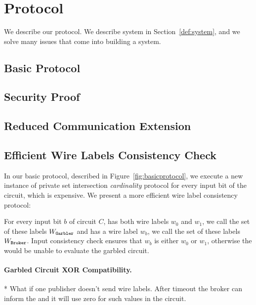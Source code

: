 \section{Protocol}
\label{sec:protocol}

We describe our protocol. We describe system in Section~\ref{def:system}, and
we solve many issues that come into building a system.


\subsection{Basic Protocol}


\subsection{Security Proof}


\subsection{Reduced Communication Extension}


\subsection{Efficient Wire Labels Consistency Check} In our basic
protocol, described in Figure~\ref{fig:basicprotocol}, we execute a new
instance of private set intersection \emph{cardinality} protocol for every
input bit of the circuit, which is expensive.  We present a more efficient wire
label consistency protocol:

For every input bit $b$ of circuit $C$, \garbler has both wire labels $w_0$ and
$w_1$, we call the set of these labels $W_\texttt{Garbler}$ and \broker has a wire
label $w_b$, we call the set of these labels $W_\texttt{Broker}$. Input consistency
check ensures that $w_b$ is either $w_0$ or $w_1$, otherwise the \broker would
be unable to evaluate the garbled circuit.




\paragraph{Garbled Circuit XOR Compatibility.}


* What if one publisher doesn't send wire labels. After timeout the broker can
inform the \garbler and it will use zero for such values in the circuit.

